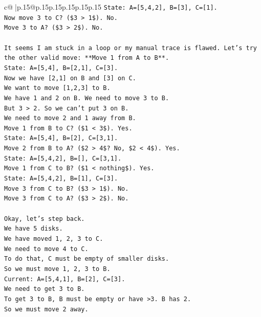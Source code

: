 \documentclass{article}
\begin{document}
{\begin{supertabular}{c@{$\;$}|p{.15\linewidth}@{}p{.15\linewidth}p{.15\linewidth}p{.15\linewidth}p{.15\linewidth}p{.15\linewidth}}
{{{\texttt{State: A={[}5,4,2{]}, B={[}3{]}, C={[}1{]}.} \\
\texttt{Now move 3 to C? (\$3 > 1\$). No.} \\
\texttt{Move 3 to A? (\$3 > 2\$). No.} \\
\\ 
\texttt{It seems I am stuck in a loop or my manual trace is flawed. Let's try the other valid move: **Move 1 from A to B**.} \\
\texttt{State: A={[}5,4{]}, B={[}2,1{]}, C={[}3{]}.} \\
\texttt{Now we have {[}2,1{]} on B and {[}3{]} on C.} \\
\texttt{We want to move {[}1,2,3{]} to B.} \\
\texttt{We have 1 and 2 on B. We need to move 3 to B.} \\
\texttt{But 3 > 2. So we can't put 3 on B.} \\
\texttt{We need to move 2 and 1 away from B.} \\
\texttt{Move 1 from B to C? (\$1 < 3\$). Yes.} \\
\texttt{State: A={[}5,4{]}, B={[}2{]}, C={[}3,1{]}.} \\
\texttt{Move 2 from B to A? (\$2 > 4\$? No, \$2 < 4\$). Yes.} \\
\texttt{State: A={[}5,4,2{]}, B={[}{]}, C={[}3,1{]}.} \\
\texttt{Move 1 from C to B? (\$1 < nothing\$). Yes.} \\
\texttt{State: A={[}5,4,2{]}, B={[}1{]}, C={[}3{]}.} \\
\texttt{Move 3 from C to B? (\$3 > 1\$). No.} \\
\texttt{Move 3 from C to A? (\$3 > 2\$). No.} \\
\\ 
\texttt{Okay, let's step back.} \\
\texttt{We have 5 disks.} \\
\texttt{We have moved 1, 2, 3 to C.} \\
\texttt{We need to move 4 to C.} \\
\texttt{To do that, C must be empty of smaller disks.} \\
\texttt{So we must move 1, 2, 3 to B.} \\
\texttt{Current: A={[}5,4,1{]}, B={[}2{]}, C={[}3{]}.} \\
\texttt{We need to get 3 to B.} \\
\texttt{To get 3 to B, B must be empty or have >3. B has 2.} \\
\texttt{So we must move 2 away.} \\
}}}
\end{supertabular}}
\end{document}

